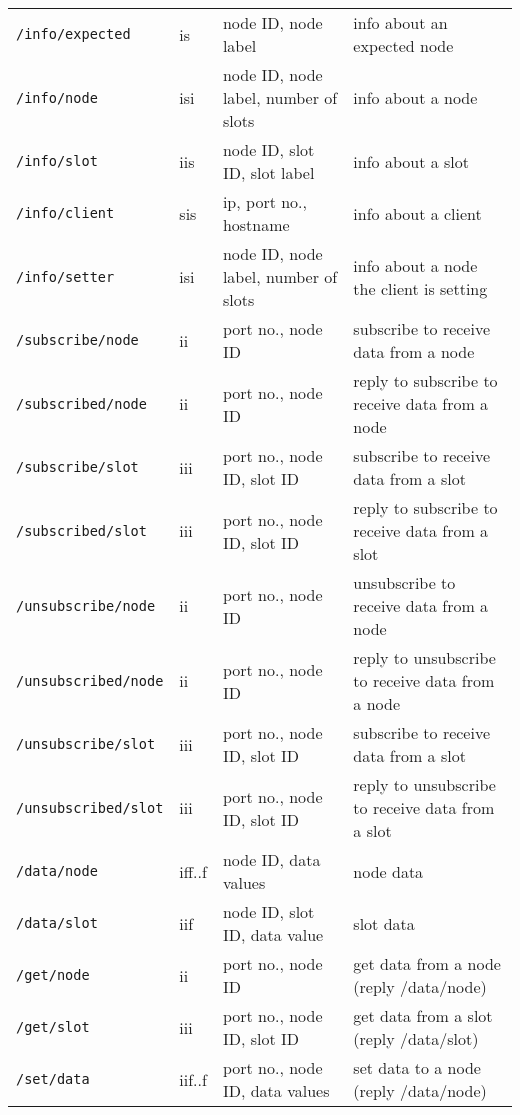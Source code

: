 \documentclass[letterpaper,10pt]{article}
\begin{document}
\begin{sidewaystable}[!tbp]
\begin{center}
\begin{tabular}{|llll|}
\verb|/info/expected| & is & node ID, node label & info about an expected node \\
\verb|/info/node| & isi & node ID, node label, number of slots & info about a node \\
\verb|/info/slot| & iis & node ID, slot ID, slot label & info about a slot \\
\verb|/info/client| & sis & ip, port no., hostname & info about a client \\
\verb|/info/setter| & isi & node ID, node label, number of slots & info about a node the client is setting \\

\verb|/subscribe/node| & ii & port no., node ID & subscribe to receive data from a node \\
\verb|/subscribed/node| & ii & port no., node ID & reply to subscribe to receive data from a node \\

\verb|/subscribe/slot| & iii & port no., node ID, slot ID & subscribe to receive data from a slot \\  
\verb|/subscribed/slot| & iii & port no., node ID, slot ID & reply to subscribe to receive data from a slot \\  

\verb|/unsubscribe/node| & ii & port no., node ID & unsubscribe to receive data from a node \\
\verb|/unsubscribed/node| & ii & port no., node ID & reply to unsubscribe to receive data from a node \\

\verb|/unsubscribe/slot| & iii & port no., node ID, slot ID & subscribe to receive data from a slot \\  
\verb|/unsubscribed/slot| & iii & port no., node ID, slot ID & reply to unsubscribe to receive data from a slot \\  

\verb|/data/node| & iff..f & node ID, data values & node data \\
\verb|/data/slot| & iif & node ID, slot ID, data value & slot data \\
\verb|/get/node| & ii & port no., node ID & get data from a node (reply /data/node) \\
\verb|/get/slot| & iii & port no., node ID, slot ID & get data from a slot (reply /data/slot) \\

\verb|/set/data| & iif..f & port no., node ID, data values & set data to a node  (reply /data/node)\\


\end{tabular}
\end{center}
\end{sidewaystable}
\end{document}
